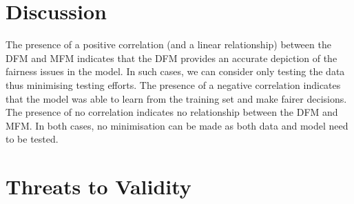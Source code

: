 \documentclass{article}
\begin{document}
\section{Discussion}\label{sec:discuss}

The presence of a positive correlation (and a linear relationship)
between the DFM and MFM indicates that the DFM provides an accurate
depiction of the fairness issues in the model. In such cases, we can
consider only testing the data thus minimising testing efforts. The
presence of a negative correlation indicates that the model was able
to learn from the training set and make fairer decisions. The presence
of no correlation indicates no relationship between the DFM and MFM.
In both cases, no minimisation can be made as both data and model need
to be tested.







\section{Threats to Validity}\label{sec:threats}

\end{document}

